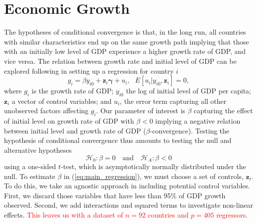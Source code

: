 \documentclass[11pt]{article}
\begin{document}

\section{Economic Growth}
The hypotheses of conditional convergence is that, in the long run, all countries with similar characteristics end up on the same growth path implying that those with an initially low level of GDP experience a higher growth rate of GDP, and vice versa. 
The relation between growth rate and initial level of GDP can be explored following \cite{Barro_1991} in setting up a regression for country $i$
\begin{equation}
\label{eq:main_regression}
    g_i=\beta y_{i0} + \mathbf{z}_i \mathbf{\gamma} + u_i, ~~~E[u_i|y_{i0},\mathbf{z}_i]=0,
\end{equation}
where $g_i$ is the growth rate of GDP; $y_{i0}$ the log of initial level of GDP per capita; $\mathbf{z}_i$ a vector of control variables; and $u_i$, the error term capturing all other unobserved factors affecting $g_i$. Our parameter of interest is $\beta$ capturing the effect of initial level on growth rate of GDP with $\beta<0$ implying a negative relation between initial level and growth rate of GDP ($\beta$-convergence). Testing the hypothesis of conditional convergence thus amounts to testing the null and alternative hypotheses
\begin{equation}
    \label{eq:Hypotheses}
    \mathcal{H}_0: \beta=0 \quad \text{and} \quad \mathcal{H}_A: \beta<0
\end{equation}
using a one-sided $t$-test, which is asymptotically normally distributed under the null. To estimate $\beta$ in (\ref{eq:main_regression}), we must choose a set of controls, $\mathbf{z}_i$. To do this, we take an agnostic approach in including potential control variables. First, we discard those variables that have less than 95\% of GDP growth observed. Second, we add interactions and squared terms to investigate non-linear effects. \textcolor{red}{This leaves us with a dataset of $n=92$ countries and $p=405$ regressors.}
\end{document}
